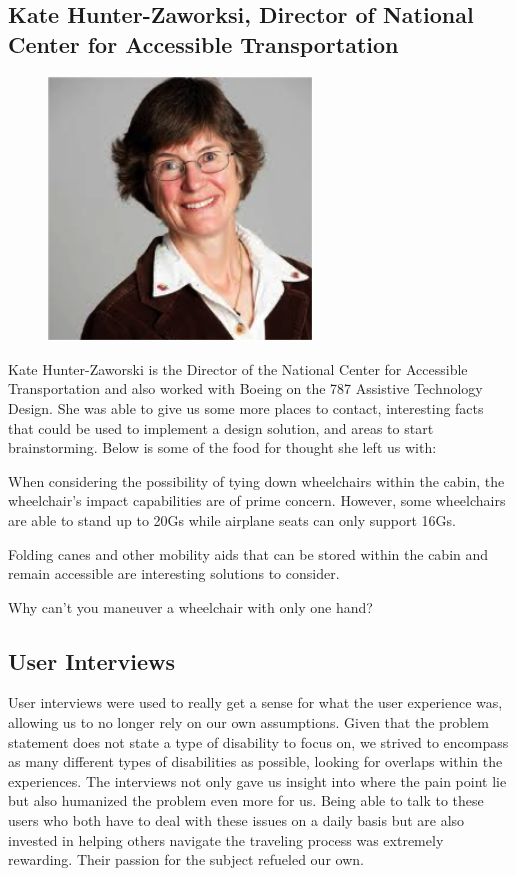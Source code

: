 \subsection{Kate Hunter-Zaworksi, Director of National Center for Accessible Transportation}
\begin{figure}[h]
  \centering
     \includegraphics[width=7cm]{images/image021}
  \label{fig:21}
\end{figure}
Kate Hunter-Zaworski is the Director of the National Center for Accessible Transportation and also worked with Boeing on the 787 Assistive Technology Design.  She was able to give us some more places to contact, interesting facts that could be used to implement a design solution, and areas to start brainstorming.  Below is some of the food for thought she left us with:

\begin{list}{-}{}
  \item When considering the possibility of tying down wheelchairs within the cabin, the wheelchair’s impact capabilities are of prime concern. However, some wheelchairs are able to stand up to 20Gs while airplane seats can only support 16Gs.
  \item Folding canes and other mobility aids that can be stored within the cabin and remain accessible are interesting solutions to consider. 
  \item Why can’t you maneuver a wheelchair with only one hand?
\end{list}

\subsection{User Interviews}
User interviews were used to really get a sense for what the user experience was, allowing us to no longer rely on our own assumptions. Given that the problem statement does not state a type of disability to focus on, we strived to encompass as many different types of disabilities as possible, looking for overlaps within the experiences. The interviews not only gave us insight into where the pain point lie but also humanized the problem even more for us. Being able to talk to these users who both have to deal with these issues on a daily basis but are also invested in helping others navigate the traveling process was extremely rewarding. Their passion for the subject refueled our own. 

